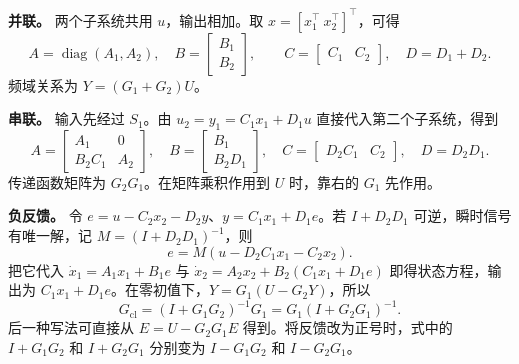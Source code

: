 \textbf{并联。} 两个子系统共用 $u$，输出相加。取 $x=[x_1^\top\ x_2^\top]^\top$，可得
\[
    A=\operatorname{diag}(A_1,A_2),\quad B=\begin{bmatrix}B_1\\B_2\end{bmatrix},
    \qquad C=\begin{bmatrix}C_1&C_2\end{bmatrix},\quad D=D_1+D_2 .
\]
频域关系为 $Y=(G_1+G_2)U$。

\textbf{串联。} 输入先经过 $S_1$。由 $u_2=y_1=C_1x_1+D_1u$ 直接代入第二个子系统，得到
\[
    A=\begin{bmatrix}A_1&0\\B_2C_1&A_2\end{bmatrix},\quad
    B=\begin{bmatrix}B_1\\B_2D_1\end{bmatrix},\quad
    C=\begin{bmatrix}D_2C_1&C_2\end{bmatrix},\quad D=D_2D_1 .
\]
传递函数矩阵为 $G_2G_1$。在矩阵乘积作用到 $U$ 时，靠右的 $G_1$ 先作用。

\textbf{负反馈。} 令 $e=u-C_2x_2-D_2y$、$y=C_1x_1+D_1e$。若 $I+D_2D_1$ 可逆，瞬时信号有唯一解，记 $M=(I+D_2D_1)^{-1}$，则
\[
    e=M(u-D_2C_1x_1-C_2x_2).
\]
把它代入 $\dot x_1=A_1x_1+B_1 e$ 与
$\dot x_2=A_2x_2+B_2(C_1x_1+D_1e)$ 即得状态方程，输出为 $C_1x_1+D_1e$。在零初值下，$Y=G_1(U-G_2Y)$，所以
\[
   G_{\mathrm{cl}}=(I+G_1G_2)^{-1}G_1=G_1(I+G_2G_1)^{-1}.
\]
后一种写法可直接从 $E=U-G_2G_1E$ 得到。将反馈改为正号时，式中的 $I+G_1G_2$ 和 $I+G_2G_1$ 分别变为 $I-G_1G_2$ 和 $I-G_2G_1$。

